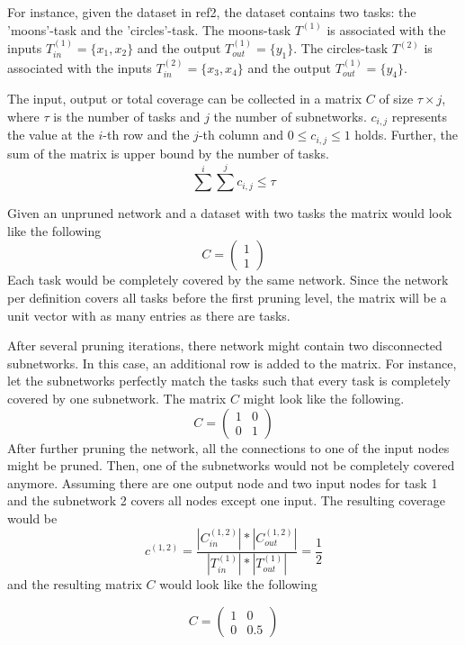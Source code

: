 For instance, given the dataset in ref2, the dataset contains two tasks: the 'moons'-task and the 'circles'-task. 
The moons-task $T^{(1)}$ is associated with the inputs $T^{(1)}_{in} = \{x_1,x_2\}$ and the output $T^{(1)}_{out} = \{y_1\}$.
The circles-task $T^{(2)}$ is associated with the inputs $T^{(2)}_{in} = \{x_3,x_4\}$ and the output $T^{(1)}_{out} = \{y_4\}$.

The input, output or total coverage can be collected in a matrix $C$ of size $\tau \times j$, where $\tau$ is the number of tasks and $j$ the number of subnetworks. 
$c_{i,j}$ represents the value at the $i$-th row and the $j$-th column and $0 \leq c_{i,j} \leq 1$ holds.
Further, the sum of the matrix is upper bound by the number of tasks.
$$
\sum^{i} \sum^{j} c_{i,j} \leq \tau
$$


Given an unpruned network and a dataset with two tasks the matrix would look like the following 
$$
C = \begin{pmatrix}
    1 \\ 1
\end{pmatrix}
$$
Each task would be completely covered by the same network.
Since the network per definition covers all tasks before the first pruning level, the matrix will be a unit vector with as many entries as there are tasks.

After several pruning iterations, there network might contain two disconnected subnetworks.
In this case, an additional row is added to the matrix.
For instance, let the subnetworks perfectly match the tasks such that every task is completely covered by one subnetwork.
The matrix $C$ might look like the following.
$$
C = \begin{pmatrix}
    1 & 0 \\ 0 & 1
\end{pmatrix}
$$
After further pruning the network, all the connections to one of the input nodes might be pruned.
Then, one of the subnetworks would not be completely covered anymore.
Assuming there are one output node and two input nodes for task 1 and the subnetwork 2 covers all nodes except one input.
The resulting coverage would be 
$$
c^{(1,2)} =  \frac{
    | C^{(1,2)}_{in}| * | C^{(1,2)}_{out} |
    }{
    |T^{(1)}_{in}| * |T^{(1)}_{out}|
} = \frac{1}{2}
$$
and the resulting matrix $C$ would look like the following

$$
C = \begin{pmatrix}
    1 & 0 \\ 0 & 0.5
\end{pmatrix}
$$

